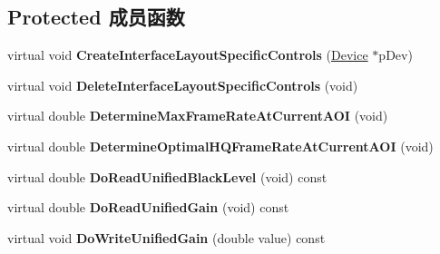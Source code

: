 \subsection*{Protected 成员函数}
\begin{DoxyCompactItemize}
\item 
\hypertarget{class_wizard_quick_setup_device_specific_acc3b05785a8523349b4a427eefd7f410}{virtual void {\bfseries Create\+Interface\+Layout\+Specific\+Controls} (\hyperlink{classmv_i_m_p_a_c_t_1_1acquire_1_1_device}{Device} $\ast$p\+Dev)}\label{class_wizard_quick_setup_device_specific_acc3b05785a8523349b4a427eefd7f410}

\item 
\hypertarget{class_wizard_quick_setup_device_specific_aea7e814d5e9d2e617879a428c7d63db4}{virtual void {\bfseries Delete\+Interface\+Layout\+Specific\+Controls} (void)}\label{class_wizard_quick_setup_device_specific_aea7e814d5e9d2e617879a428c7d63db4}

\item 
\hypertarget{class_wizard_quick_setup_device_specific_a6edfb601a1b5ce2bf308452fdb665a1e}{virtual double {\bfseries Determine\+Max\+Frame\+Rate\+At\+Current\+A\+O\+I} (void)}\label{class_wizard_quick_setup_device_specific_a6edfb601a1b5ce2bf308452fdb665a1e}

\item 
\hypertarget{class_wizard_quick_setup_device_specific_a43efbbc9254edfa1c3f0982735831093}{virtual double {\bfseries Determine\+Optimal\+H\+Q\+Frame\+Rate\+At\+Current\+A\+O\+I} (void)}\label{class_wizard_quick_setup_device_specific_a43efbbc9254edfa1c3f0982735831093}

\item 
\hypertarget{class_wizard_quick_setup_device_specific_a2231263afee13b00088ff58fccc0f552}{virtual double {\bfseries Do\+Read\+Unified\+Black\+Level} (void) const }\label{class_wizard_quick_setup_device_specific_a2231263afee13b00088ff58fccc0f552}

\item 
\hypertarget{class_wizard_quick_setup_device_specific_ab66dba824cff043614785e0a07161771}{virtual double {\bfseries Do\+Read\+Unified\+Gain} (void) const }\label{class_wizard_quick_setup_device_specific_ab66dba824cff043614785e0a07161771}

\item 
\hypertarget{class_wizard_quick_setup_device_specific_a1ea5129d679feb3ab55a05890e312a27}{virtual void {\bfseries Do\+Write\+Unified\+Gain} (double value) const }\label{class_wizard_quick_setup_device_specific_a1ea5129d679feb3ab55a05890e312a27}


\end{DoxyCompactItemize}
